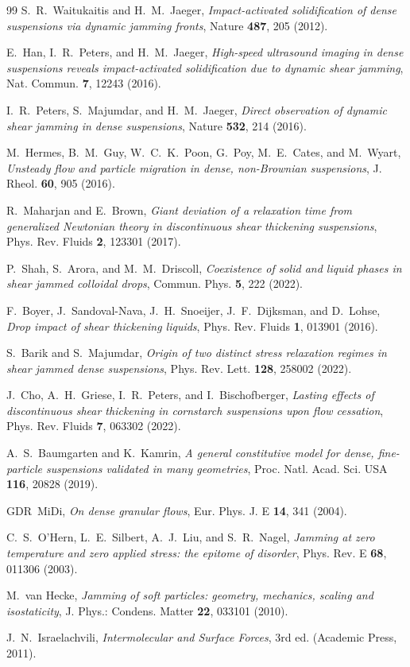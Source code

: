 \documentclass[11pt]{article}
\begin{document}
\begin{thebibliography}{99}
 S.~R.~Waitukaitis and H.~M.~Jaeger, \emph{Impact-activated solidification of dense suspensions via dynamic jamming fronts}, Nature \textbf{487}, 205 (2012).

 E.~Han, I.~R.~Peters, and H.~M.~Jaeger, \emph{High-speed ultrasound imaging in dense suspensions reveals impact-activated solidification due to dynamic shear jamming}, Nat. Commun. \textbf{7}, 12243 (2016).

 I.~R.~Peters, S.~Majumdar, and H.~M.~Jaeger, \emph{Direct observation of dynamic shear jamming in dense suspensions}, Nature \textbf{532}, 214 (2016).

 M.~Hermes, B.~M.~Guy, W.~C.~K.~Poon, G.~Poy, M.~E.~Cates, and M.~Wyart, \emph{Unsteady flow and particle migration in dense, non-Brownian suspensions}, J. Rheol. \textbf{60}, 905 (2016).

 R.~Maharjan and E.~Brown, \emph{Giant deviation of a relaxation time from generalized Newtonian theory in discontinuous shear thickening suspensions}, Phys. Rev. Fluids \textbf{2}, 123301 (2017).

 P.~Shah, S.~Arora, and M.~M.~Driscoll, \emph{Coexistence of solid and liquid phases in shear jammed colloidal drops}, Commun. Phys. \textbf{5}, 222 (2022).

 F.~Boyer, J.~Sandoval-Nava, J.~H.~Snoeijer, J.~F.~Dijksman, and D.~Lohse, \emph{Drop impact of shear thickening liquids}, Phys. Rev. Fluids \textbf{1}, 013901 (2016).

 S.~Barik and S.~Majumdar, \emph{Origin of two distinct stress relaxation regimes in shear jammed dense suspensions}, Phys. Rev. Lett. \textbf{128}, 258002 (2022).

 J.~Cho, A.~H.~Griese, I.~R.~Peters, and I.~Bischofberger, \emph{Lasting effects of discontinuous shear thickening in cornstarch suspensions upon flow cessation}, Phys. Rev. Fluids \textbf{7}, 063302 (2022).

 A.~S.~Baumgarten and K.~Kamrin, \emph{A general constitutive model for dense, fine-particle suspensions validated in many geometries}, Proc. Natl. Acad. Sci. USA \textbf{116}, 20828 (2019).

 GDR~MiDi, \emph{On dense granular flows}, Eur. Phys. J. E \textbf{14}, 341 (2004).

 C.~S.~O'Hern, L.~E.~Silbert, A.~J.~Liu, and S.~R.~Nagel, \emph{Jamming at zero temperature and zero applied stress: the epitome of disorder}, Phys. Rev. E \textbf{68}, 011306 (2003).

 M.~van Hecke, \emph{Jamming of soft particles: geometry, mechanics, scaling and isostaticity}, J. Phys.: Condens. Matter \textbf{22}, 033101 (2010).

 J.~N.~Israelachvili, \emph{Intermolecular and Surface Forces}, 3rd ed. (Academic Press, 2011).

\end{thebibliography}
\end{document}
